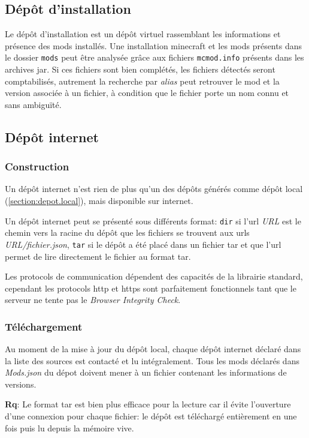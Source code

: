 \documentclass{article}
\newcommand{\remarque}[0]{\par\noindent\textbf{Rq}: }
\begin{document}
\subsection{Dépôt d'installation}
\label{section:depot.installation}
Le dépôt d'installation est un dépôt virtuel rassemblant les informations et présence des mods installés.
Une installation minecraft et les mods présents dans le dossier \texttt{mods} peut être analysée grâce aux fichiers \texttt{mcmod.info} présents dans les archives jar.
Si ces fichiers sont bien complétés, les fichiers détectés seront comptabilisés, autrement la recherche par \textit{alias} peut retrouver le mod et la version associée à un fichier, à condition que le fichier porte un nom connu et sans ambiguïté.

\subsection{Dépôt internet}
\label{section:depot.internet}
\subsubsection{Construction}
Un dépôt internet n'est rien de plus qu'un des dépôts générés comme dépôt local (\ref{section:depot.local}), mais disponible sur internet.

Un dépôt internet peut se présenté sous différents format: \texttt{dir} si l'url \textit{URL} est le chemin vers la racine du dépôt que les fichiers se trouvent aux urls \textit{URL/fichier.json}, \texttt{tar} si le dépôt a été placé dans un fichier tar et que l'url permet de lire directement le fichier au format tar.

Les protocols de communication dépendent des capacités de la librairie standard, cependant les protocols http et https sont parfaitement fonctionnels tant que le serveur ne tente pas le \textit{Browser Integrity Check}.

\subsubsection{Téléchargement}
Au moment de la mise à jour du dépôt local, chaque dépôt internet déclaré dans la liste des sources est contacté et lu intégralement.
Tous les mods déclarés dans \textit{Mods.json} du dépot doivent mener à un fichier contenant les informations de versions.

\remarque Le format tar est bien plus efficace pour la lecture car il évite l'ouverture d'une connexion pour chaque fichier: le dépôt est téléchargé entièrement en une fois puis lu depuis la mémoire vive.
\end{document}
